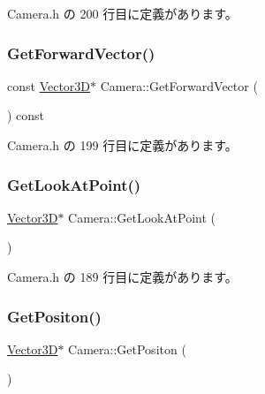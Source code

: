  Camera.\+h の 200 行目に定義があります。

\mbox{\label{class_camera_aec9441c5c1924df0a0cacbcf28c839e2}} 
\subsubsection{\texorpdfstring{Get\+Forward\+Vector()}{GetForwardVector()}}
{\footnotesize\ttfamily const \mbox{\hyperlink{class_vector3_d}{Vector3D}}$\ast$ Camera\+::\+Get\+Forward\+Vector (\begin{DoxyParamCaption}{ }\end{DoxyParamCaption}) const\hspace{0.3cm}{\ttfamily [inline]}}



 Camera.\+h の 199 行目に定義があります。

\mbox{\label{class_camera_a4cc3e87e6522b4a1ae72eab5b87430a6}} 
\subsubsection{\texorpdfstring{Get\+Look\+At\+Point()}{GetLookAtPoint()}}
{\footnotesize\ttfamily \mbox{\hyperlink{class_vector3_d}{Vector3D}}$\ast$ Camera\+::\+Get\+Look\+At\+Point (\begin{DoxyParamCaption}{ }\end{DoxyParamCaption})\hspace{0.3cm}{\ttfamily [inline]}}



 Camera.\+h の 189 行目に定義があります。

\mbox{\label{class_camera_a18f380bd6b2c42162c8fcf7e4441a355}} 
\subsubsection{\texorpdfstring{Get\+Positon()}{GetPositon()}}
{\footnotesize\ttfamily \mbox{\hyperlink{class_vector3_d}{Vector3D}}$\ast$ Camera\+::\+Get\+Positon (\begin{DoxyParamCaption}{ }\end{DoxyParamCaption})\hspace{0.3cm}{\ttfamily [inline]}}



